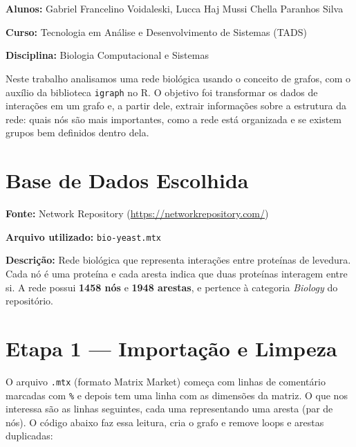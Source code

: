 \documentclass[12pt,a4paper]{article}
\begin{document}
\section{}

\textbf{Alunos:} Gabriel Francelino Voidaleski, Lucca Haj Mussi Chella Paranhos Silva

\textbf{Curso:} Tecnologia em Análise e Desenvolvimento de Sistemas (TADS)

\textbf{Disciplina:} Biologia Computacional e Sistemas

\vspace{0.5cm}

Neste trabalho analisamos uma rede biológica usando o conceito de grafos, com o auxílio da biblioteca \texttt{igraph} no R. O objetivo foi transformar os dados de interações em um grafo e, a partir dele, extrair informações sobre a estrutura da rede: quais nós são mais importantes, como a rede está organizada e se existem grupos bem definidos dentro dela.

\section{Base de Dados Escolhida}

\textbf{Fonte:} Network Repository (\url{https://networkrepository.com/})

\textbf{Arquivo utilizado:} \texttt{bio-yeast.mtx}

\textbf{Descrição:} Rede biológica que representa interações entre proteínas de levedura. Cada nó é uma proteína e cada aresta indica que duas proteínas interagem entre si. A rede possui \textbf{1458 nós} e \textbf{1948 arestas}, e pertence à categoria \textit{Biology} do repositório.

\section{Etapa 1 — Importação e Limpeza}

O arquivo \texttt{.mtx} (formato Matrix Market) começa com linhas de comentário marcadas com \texttt{\%} e depois tem uma linha com as dimensões da matriz. O que nos interessa são as linhas seguintes, cada uma representando uma aresta (par de nós). O código abaixo faz essa leitura, cria o grafo e remove loops e arestas duplicadas:
\end{document}
